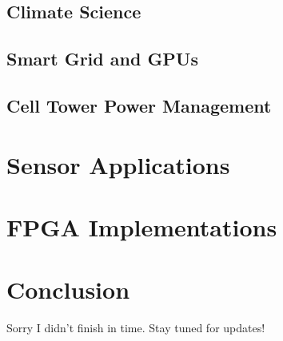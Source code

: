 \documentclass[11pt]{article}
\begin{document}
\subsection{Climate Science}
\cite{menard2000assimilation1,menard2000assimilation2,lyster1997parallel}

\subsection{Smart Grid and GPUs}
\cite{karimipour2015extended}

\subsection{Cell Tower Power Management}
\cite{rosen2013parallelization}

\section{Sensor Applications}
\cite{rao1991fully,spanos2005distributed,spanos2005approximate,hashemipour1988decentralized}

\section{FPGA Implementations}
\cite{bonato2009floating,liu2007efficient}

\section{Conclusion}
Sorry I didn't finish in time. Stay tuned for updates!

\nocite{*}


\end{document}
